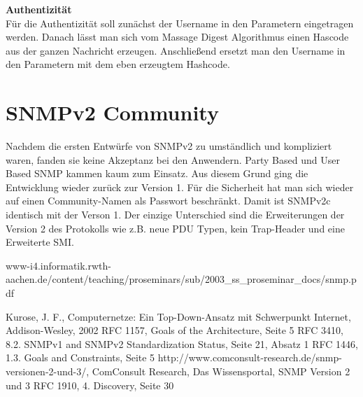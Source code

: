 \documentclass[11pt,a4paper]{article}
\begin{document}
\textbf{Authentizität}\\
Für die Authentizität soll zunächst der Username in den Parametern eingetragen werden. Danach lässt man sich vom Massage Digest Algorithmus einen Hascode aus der ganzen Nachricht erzeugen. Anschließend ersetzt man den Username in den Parametern mit dem eben erzeugtem Hashcode.\\

\section{SNMPv2 Community}
Nachdem die ersten Entwürfe von SNMPv2 zu umständlich und kompliziert waren, fanden sie keine Akzeptanz bei den Anwendern. Party Based und User Based SNMP kammen kaum zum Einsatz. Aus diesem Grund ging die Entwicklung wieder zurück zur Version 1. Für die Sicherheit hat man sich wieder auf einen Community-Namen als Passwort beschränkt. Damit ist SNMPv2c identisch mit der Verson 1. Der einzige Unterschied sind die Erweiterungen der Version 2 des Protokolls wie z.B. neue PDU Typen, kein Trap-Header und eine Erweiterte SMI.\\


\pagebreak
\begin{thebibliography}{10}
	\begin{small}
		www-i4.informatik.rwth-aachen.de/content/teaching/proseminars/sub/2003\_ss\_proseminar\_docs/snmp.pdf
	\end{small}
		Kurose, J. F.,
		Computernetze: Ein Top-Down-Ansatz mit Schwerpunkt Internet,
		Addison-Wesley,
		2002
		RFC 1157, Goals of the Architecture, Seite 5
		RFC 3410, 8.2.  SNMPv1 and SNMPv2 Standardization Status, Seite 21, Absatz 1
		RFC 1446, 1.3.  Goals and Constraints, Seite 5
		http://www.comconsult-research.de/snmp-versionen-2-und-3/,
		ComConsult Research, Das Wissensportal, SNMP Version 2 und 3
		RFC 1910, 4. Discovery, Seite 30
\end{thebibliography}
\end{document}
